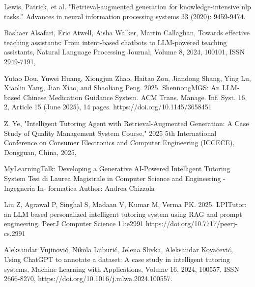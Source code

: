 \documentclass[11pt, a4paper, oneside]{report}
\begin{document}
\begin{enumerate}[leftmargin=3em, label={[{\arabic*}]}, itemsep=6pt]
  \item \label{cite:lewis2020}
        Lewis, Patrick, et al. "Retrieval-augmented generation for knowledge-intensive nlp tasks." Advances in neural information processing systems 33 (2020): 9459-9474.
    

  \item \label{cite:alsafari2024}
        Bashaer Alsafari, Eric Atwell, Aisha Walker, Martin Callaghan,
Towards effective teaching assistants: From intent-based chatbots to LLM-powered teaching assistants,
Natural Language Processing Journal,
Volume 8,
2024,
100101,
ISSN 2949-7191,

  \item \label{cite:dou2025}
        Yutao Dou, Yuwei Huang, Xiongjun Zhao, Haitao Zou, Jiandong Shang, Ying Lu, Xiaolin Yang, Jian Xiao, and Shaoliang Peng. 2025. ShennongMGS: An LLM-based Chinese Medication Guidance System. ACM Trans. Manage. Inf. Syst. 16, 2, Article 15 (June 2025), 14 pages. https://doi.org/10.1145/3658451


  \item \label{cite:ye2025}
        Z. Ye, "Intelligent Tutoring Agent with Retrieval-Augmented Generation: A Case Study of Quality Management System Course," 2025 5th International Conference on Consumer Electronics and Computer Engineering (ICCECE), Dongguan, China, 2025, 



  \item \label{cite:chizzola2024}
        MyLearningTalk: Developing a
Generative AI-Powered Intelligent
Tutoring System
Tesi di Laurea Magistrale in
Computer Science and Engineering - Ingegneria In-
formatica
Author: Andrea Chizzola

  \item \label{cite:lpitutor}
        Liu Z, Agrawal P, Singhal S, Madaan V, Kumar M, Verma PK. 2025. LPITutor: an LLM based personalized intelligent tutoring system using RAG and prompt engineering. PeerJ Computer Science 11:e2991 https://doi.org/10.7717/peerj-cs.2991

  \item \label{cite:vujinovic2023}
        Aleksandar Vujinović, Nikola Luburić, Jelena Slivka, Aleksandar Kovačević,
Using ChatGPT to annotate a dataset: A case study in intelligent tutoring systems,
Machine Learning with Applications,
Volume 16,
2024,
100557,
ISSN 2666-8270,
https://doi.org/10.1016/j.mlwa.2024.100557.


\end{enumerate}
\end{document}
